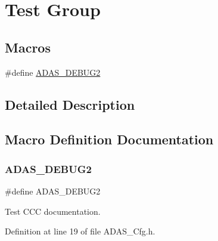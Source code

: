 \hypertarget{group___t_e_s_t___g_r_o_u_p}{}\section{Test Group}
\label{group___t_e_s_t___g_r_o_u_p}
\subsection*{Macros}
\begin{DoxyCompactItemize}
\item 
\#define \mbox{\hyperlink{group___t_e_s_t___g_r_o_u_p_gaf1b7294cc1d532b3a1ab577b76852a39}{A\+D\+A\+S\+\_\+\+D\+E\+B\+U\+G2}}
\end{DoxyCompactItemize}


\subsection{Detailed Description}


\subsection{Macro Definition Documentation}
\mbox{\label{group___t_e_s_t___g_r_o_u_p_gaf1b7294cc1d532b3a1ab577b76852a39}} 
\subsubsection{\texorpdfstring{A\+D\+A\+S\+\_\+\+D\+E\+B\+U\+G2}{ADAS\_DEBUG2}}
{\footnotesize\ttfamily \#define A\+D\+A\+S\+\_\+\+D\+E\+B\+U\+G2}

Test C\+CC documentation. 

Definition at line 19 of file A\+D\+A\+S\+\_\+\+Cfg.\+h.

